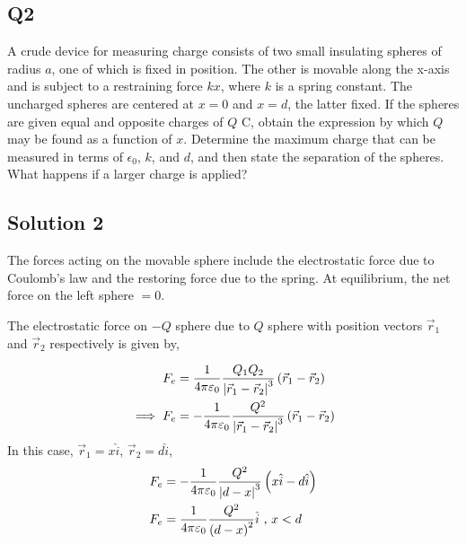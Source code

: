 \documentclass[12pt]{article}
\providecommand{\brak}[1]{\ensuremath{\left(#1\right)}}
\begin{document}
\subsection*{Q2}
A crude device for measuring charge consists of two small insulating spheres of radius $a$, one of which is fixed in position. The other is movable along the x-axis and is subject to a restraining force $kx$, where $k$ is a spring constant. The uncharged spheres are centered at $x = 0$ and $x = d$, the latter fixed. If the spheres are given equal and opposite charges of $Q$ C, obtain the expression by which $Q$ may be found as a function of $x$. Determine the maximum charge that can be measured in terms of $\epsilon_0$, $k$, and $d$, and then state the separation of the spheres. What happens if a larger charge is applied?
\subsection*{Solution 2}
\begin{figure}[!ht]
\centering
{}%

\label{fig:my_label}
\end{figure}

The forces acting on the movable sphere include the electrostatic force due to Coulomb's law and the restoring force due to the spring. At equilibrium, the net force on the left sphere $= 0$.

The electrostatic force on $-Q$ sphere due to $Q$ sphere with position vectors $\vec{r}_1$ and $\vec{r}_2$ respectively is given by,

\begin{align*}
F_e &= \frac{1}{4\pi \varepsilon_0} \frac{Q_1 Q_2}{\abs{\vec{r}_1 - \vec{r}_2}^3} \brak{\vec{r}_1 - \vec{r}_2}\\
\implies F_e &= -\frac{1}{4\pi \varepsilon_0} \frac{Q^2}{\abs{\vec{r}_1 - \vec{r}_2}^3} \brak{\vec{r}_1 - \vec{r}_2}
\end{align*}
In this case, $\vec{r}_1 = x \hat{i}$, $\vec{r}_2 = d \hat{i}$,
\begin{align*}
    F_e &= -\frac{1}{4\pi \varepsilon_0} \frac{Q^2}{\abs{d - x}^3} \brak{x\hat{i} - d\hat{i}}\\
    F_e &= \frac{1}{4\pi \varepsilon_0} \frac{Q^2}{\brak{d - x}^2} \hat{i} \text{ , } x < d
\end{align*}
\end{document}
